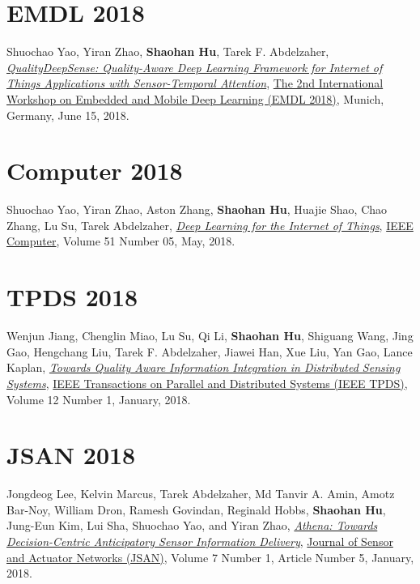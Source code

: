 \section{\sc EMDL 2018}\hypertarget{yao2018emdl}{}
Shuochao Yao, Yiran Zhao, \textbf{Shaohan Hu}, Tarek F. Abdelzaher,
\href{https://dl.acm.org/citation.cfm?id=3212729}{\emph{QualityDeepSense: Quality-Aware Deep Learning Framework for Internet of Things Applications with Sensor-Temporal Attention}},
\href{https://www.sigmobile.org/mobisys/2018/workshops/deepmobile18/index.html}{\textsf{The 2nd International Workshop on Embedded and Mobile Deep Learning (EMDL 2018)}},
Munich, Germany, June 15, 2018.

\section{\sc Computer 2018}\hypertarget{yao2018computer}{}
Shuochao Yao, Yiran Zhao, Aston Zhang, \textbf{Shaohan Hu}, Huajie Shao, Chao Zhang, Lu Su, Tarek Abdelzaher,
\href{https://ieeexplore.ieee.org/document/8364644}{\emph{Deep Learning for the Internet of Things}},
\href{https://publications.computer.org/computer-magazine/}{\textsf{IEEE Computer}},
Volume 51 Number 05, May, 2018.

\section{\sc TPDS 2018}\hypertarget{jiang2018tpds}{}
Wenjun Jiang, Chenglin Miao, Lu Su, Qi Li, \textbf{Shaohan Hu}, Shiguang Wang, Jing Gao, Hengchang Liu, Tarek F. Abdelzaher, Jiawei Han, Xue Liu, Yan Gao, Lance Kaplan,
\href{http://ieeexplore.ieee.org/document/7940106/}{\emph{Towards Quality Aware Information Integration in Distributed Sensing Systems}},
\href{https://www.computer.org/web/tpds}{\textsf{IEEE Transactions on Parallel and Distributed Systems (IEEE TPDS)}},
Volume 12 Number 1, January, 2018.

\section{\sc JSAN 2018}\hypertarget{lee2018jsan}{}
Jongdeog Lee, Kelvin Marcus, Tarek Abdelzaher, Md Tanvir A. Amin, Amotz Bar-Noy, William Dron, Ramesh Govindan, Reginald Hobbs, \textbf{Shaohan Hu}, Jung-Eun Kim, Lui Sha, Shuochao Yao, and Yiran Zhao,
\href{http://www.mdpi.com/2224-2708/7/1/5/htm}{\emph{Athena: Towards Decision-Centric Anticipatory Sensor Information Delivery}},
\href{http://www.mdpi.com/journal/jsan}{\textsf{Journal of Sensor and Actuator Networks (JSAN)}},
Volume 7 Number 1, Article Number 5, January, 2018.


